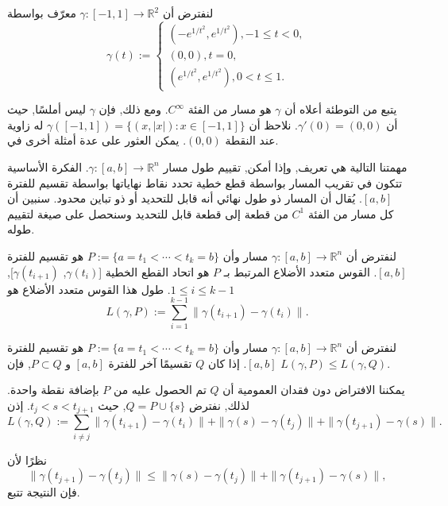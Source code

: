 \begin{exemple}
لنفترض أن \( \gamma : [−1, 1] \to \mathbb{R}^2 \) معرّف بواسطة
\[ \gamma(t) := \begin{cases} \left( -e^{1/t^2}, e^{1/t^2} \right), −1 \leq t < 0, \\ (0, 0), t = 0, \\ \left( e^{1/t^2}, e^{1/t^2} \right), 0 < t \leq 1. \end{cases} \]
\end{exemple}

يتبع من التوطئة أعلاه أن \( \gamma \) هو مسار من الفئة \( C^\infty \). ومع ذلك, فإن \( \gamma \) ليس أملسًا, حيث أن \( \gamma'(0) = (0, 0) \). نلاحظ أن \( \gamma([−1, 1]) = \{(x, |x|) : x \in [−1, 1]\} \) له زاوية عند النقطة $(0,0)$. يمكن العثور على عدة أمثلة أخرى في.

مهمتنا التالية هي تعريف, وإذا أمكن, تقييم طول مسار \( \gamma : [a, b] \to \mathbb{R}^n \). الفكرة الأساسية تتكون في تقريب المسار بواسطة قطع خطية تحدد نقاط نهاياتها بواسطة تقسيم للفترة \([a, b]\). يُقال أن المسار ذو طول نهائي أنه قابل للتحديد أو ذو تباين محدود. سنبين أن كل مسار من الفئة \( C^1 \) من قطعة إلى قطعة قابل للتحديد وسنحصل على صيغة لتقييم طوله.

\begin{definition}
لنفترض أن \( \gamma : [a, b] \to \mathbb{R}^n \) مسار وأن \( P := \{a = t_1 < \cdots < t_k = b\} \) هو تقسيم للفترة \([a, b]\). القوس متعدد الأضلاع المرتبط بـ $P$ هو اتحاد القطع الخطية [\( \gamma(t_i) \), \( \gamma(t_{i+1}) \)], \(1 \leq i \leq k−1\). طول هذا القوس متعدد الأضلاع هو
\[ L(\gamma, P) := \sum_{i=1}^{k-1} \| \gamma(t_{i+1}) - \gamma(t_i) \|. \]
\end{definition}

\begin{lemma}
    لنفترض أن \( \gamma : [a, b] \to \mathbb{R}^n \) مسار وأن \( P := \{a = t_1 < \cdots < t_k = b\} \) هو تقسيم للفترة \([a, b]\). إذا كان $Q$ تقسيمًا آخر للفترة \([a, b]\) و \( P \subset Q \), فإن \( L(\gamma, P) \leq L(\gamma, Q) \).
\end{lemma}

\begin{demonstration}[5]
يمكننا الافتراض دون فقدان العمومية أن \( Q \) تم الحصول عليه من \( P \) بإضافة نقطة واحدة. لذلك, نفترض \( Q = P \cup \{s\} \), حيث \( t_j < s < t_{j+1} \). إذن
\[ L(\gamma, Q) := \sum_{i \neq j} \| \gamma(t_{i+1}) - \gamma(t_i) \| + \| \gamma(s) - \gamma(t_j) \| + \| \gamma(t_{j+1}) - \gamma(s) \|. \]

نظرًا لأن
\[ \| \gamma(t_{j+1}) - \gamma(t_j) \| \leq \| \gamma(s) - \gamma(t_j) \| + \| \gamma(t_{j+1}) - \gamma(s) \|, \]
فإن النتيجة تتبع.
\end{demonstration}

